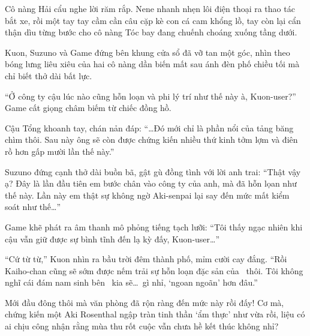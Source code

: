 \documentclass[../main.tex]{subfiles}
\begin{document}
Cô nàng Hải cẩu nghe lời răm rắp. Nene nhanh nhẹn lôi điện thoại ra thao tác bắt xe, rồi một tay tay cầm cần câu cặp kè con cá cam khổng lồ, tay còn lại cẩn thận dìu từng bước cho cô nàng Tóc bay đang chuếnh choáng xuống tầng dưới.

Kuon, Suzuno và Game đứng bên khung cửa sổ đã vỡ tan một góc, nhìn theo bóng lưng liêu xiêu của hai cô nàng dần biến mất sau ánh đèn phố chiều tối mà chỉ biết thở dài bất lực.

``Ở công ty cậu lúc nào cũng hỗn loạn và phi lý trí như thế này à, Kuon-user?'' Game cất giọng châm biếm từ chiếc đồng hồ.

Cậu Tổng khoanh tay, chán nản đáp: ``\dots Đó mới chỉ là phần nổi của tảng băng chìm thôi. Sau này ông sẽ còn được chứng kiến nhiều thứ kinh tởm lợm và điên rồ hơn gấp mười lần thế này.''

Suzuno đứng cạnh thở dài buồn bã, gật gù đồng tình với lời anh trai: ``Thật vậy ạ? Đây là lần đầu tiên em bước chân vào công ty của anh, mà đã hỗn lọan như thế này. Lần này em thật sự không ngờ Aki-senpai lại say đến mức mất kiểm soát như thế\dots''

Game khẽ phát ra âm thanh mô phỏng tiếng tạch lưỡi: ``Tôi thấy ngạc nhiên khi cậu vẫn giữ được sự bình tĩnh đến lạ kỳ đấy, Kuon-user\dots''

``Cứ từ từ,'' Kuon nhìn ra bầu trời đêm thành phố, mỉm cười cay đắng. ``Rồi Kaiho-chan cũng sẽ sớm được nếm trải sự hỗn loạn đặc sản của \hll\ thôi. Tôi không nghĩ cái đám nam sinh bên \hls\ kia sẽ\dots\ gì nhỉ, `ngoan ngoãn' hơn đâu.''

Mới đầu đông thôi mà văn phòng đã rộn ràng đến mức này rồi đấy! Cơ mà, chứng kiến một Aki Rosenthal ngập tràn tinh thần `ẩm thực' như vừa rồi, liệu có ai chịu công nhận rằng mùa thu rốt cuộc vẫn chưa hề kết thúc không nhỉ?
\end{document}
